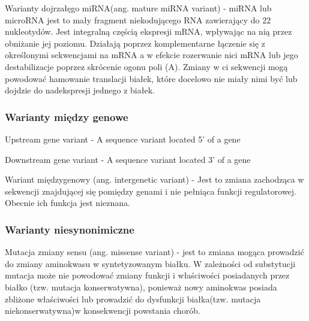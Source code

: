 \documentclass[12pt]{article}
\begin{document}
Warianty dojrzałęgo miRNA(ang. mature miRNA variant) - miRNA lub microRNA jest to mały fragment niekodującego RNA zawierający do 22 nukleotydów.  Jest integralną częścią ekspresji mRNA, wpływając na nią przez obniżanie jej poziomu.  Działają poprzez komplementarne łączenie się z określonymi sekwencjami na mRNA a w efekcie rozerwanie nici mRNA lub jego destabilizacje poprzez skrócenie ogonu poli (A). Zmiany w ci sekwencji mogą powodować hamowanie translacji białek, które docelowo nie miały nimi  być lub dojdzie do nadekspresji jednego z białek.
	
\subsubsection{Warianty między genowe}

Upstream gene variant - A sequence variant located 5' of a gene
	
Downstream gene variant - A sequence variant located 3' of a gene
	
Wariant międzygenowy (ang. intergenetic variant) - Jest to zmiana zachodząca w sekwencji znajdującej się pomiędzy genami i nie pełniąca funkcji regulatorowej. Obecnie ich funkcja jest nieznana.

\subsubsection{Warianty niesynonimiczne}
\indent
\indent Mutacja zmiany sensu (ang. missense variant) - jest to zmiana mogąca prowadzić do zmiany aminokwasu w syntetyzowanym białku. W zależności od substytucji mutacja może nie powodować zmiany funkcji i właściwości posiadanych przez białko (tzw. mutacja konserwatywna), ponieważ nowy aminokwas posiada zbliżone właściwości lub prowadzić do dysfunkcji białka(tzw. mutacja niekonserwatywna)w konsekwencji powstania chorób.
\end{document}
